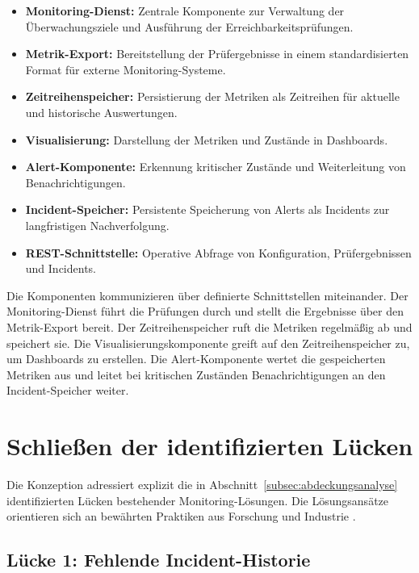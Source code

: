 \begin{itemize}
    \item \textbf{Monitoring-Dienst:} Zentrale Komponente zur Verwaltung der Überwachungsziele und Ausführung der Erreichbarkeitsprüfungen.
    \item \textbf{Metrik-Export:} Bereitstellung der Prüfergebnisse in einem standardisierten Format für externe Monitoring-Systeme.
    \item \textbf{Zeitreihenspeicher:} Persistierung der Metriken als Zeitreihen für aktuelle und historische Auswertungen.
    \item \textbf{Visualisierung:} Darstellung der Metriken und Zustände in Dashboards.
    \item \textbf{Alert-Komponente:} Erkennung kritischer Zustände und Weiterleitung von Benachrichtigungen.
    \item \textbf{Incident-Speicher:} Persistente Speicherung von Alerts als Incidents zur langfristigen Nachverfolgung.
    \item \textbf{REST-Schnittstelle:} Operative Abfrage von Konfiguration, Prüfergebnissen und Incidents.
\end{itemize}

Die Komponenten kommunizieren über definierte Schnittstellen miteinander. Der Monitoring-Dienst führt die Prüfungen durch und stellt die Ergebnisse über den Metrik-Export bereit. Der Zeitreihenspeicher ruft die Metriken regelmäßig ab und speichert sie. Die Visualisierungskomponente greift auf den Zeitreihenspeicher zu, um Dashboards zu erstellen. Die Alert-Komponente wertet die gespeicherten Metriken aus und leitet bei kritischen Zuständen Benachrichtigungen an den Incident-Speicher weiter.

\section{Schließen der identifizierten Lücken}
\label{sec:schliessen-der-luecken}

Die Konzeption adressiert explizit die in Abschnitt~\ref{subsec:abdeckungsanalyse} identifizierten Lücken bestehender Monitoring-Lösungen. Die Lösungsansätze orientieren sich an bewährten Praktiken aus Forschung und Industrie \cite{requirements-engineering-best-practices}.

\subsection{Lücke 1: Fehlende Incident-Historie}
\label{subsec:loesung-luecke-1}

